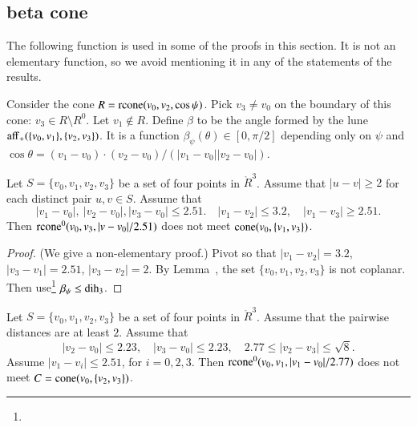 \subsection{beta cone}
The following function is used in some of the proofs in this
section.  It is not an elementary function, so we avoid mentioning
it in any of the statements of the results.  

\begin{definition}[$\beta$]
Consider the cone $R={\operatorname{rcone}}(v_0,v_2,\cos\psi)$.  Pick
$v_3\ne v_0$ on the boundary of this cone: $v_3\in R\setminus R^0$.
Let $v_1\not\in R$.  
Define $\beta$ to be the angle formed by the lune
   ${\operatorname{aff}}_+(\{v_0,v_1\},\{v_2,v_3\})$. It is a function
$\beta_\psi(\theta)\in[0,\pi/2]$ depending only on $\psi$ and
$\cos\theta = (v_1-v_0)\cdot (v_2-v_0)/(|v_1-v_0||v_2-v_0|)$.
\end{definition}


\newpage

\begin{lemma}
 Let $S=\{v_0,v_1,v_2,v_3\}$ be a set of four points in $\ring{R}^3$.
Assume that $|u-v|\ge2$ for each distinct pair $u,v\in S$.  Assume
that 
  $$
    |v_1-v_0|,\ |v_2-v_0|, |v_3-v_0|\le 2.51.\quad 
    |v_1-v_2|\le 3.2,\quad |v_1-v_3|\ge 2.51.
   $$
Then ${\operatorname{rcone}}^0(v_0,v_3,|v-v_0|/2.51)$ does not meet
${\operatorname{cone}}(v_0,\{v_1,v_3\})$.
\end{lemma}


\begin{proof} (We give a non-elementary proof.)
Pivot so that $|v_1-v_2|=3.2$, $|v_3-v_1|=2.51$, $|v_3-v_2|=2$. 
By Lemma~, the
set $\{v_0,v_1,v_2,v_3\}$ is not coplanar. 
Then use\footnote{} %
 $\beta_\psi\le \operatorname{dih}_3$.
\end{proof}

\newpage


\begin{lemma}
Let $S=\{v_0,v_1,v_2,v_3\}$ be a set of four points in $\ring{R}^3$.
Assume that the pairwise distances are at least $2$.
Assume that
   $$
   |v_2-v_0|\le 2.23,\quad |v_3-v_0|\le 2.23,\quad 2.77\le |v_2-v_3|\le\sqrt8.
   $$
Assume $|v_1-v_i|\le 2.51$, for $i=0,2,3$.
Then ${\operatorname{rcone}}^0(v_0,v_1,|v_1-v_0|/2.77)$ does not meet
$C={\operatorname{cone}}(v_0,\{v_2,v_3\})$.
\end{lemma}

